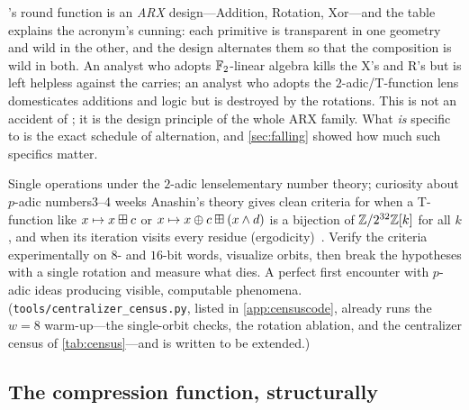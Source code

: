 \SHA{}'s round function is an \emph{ARX} design---Addition, Rotation,
Xor---and the table explains the acronym's cunning: each primitive is
transparent in one geometry and wild in the other, and the design
alternates them so that the composition is wild in both. An analyst who
adopts $\mathbb{F}_2$-linear algebra kills the X's and R's but is left helpless
against the carries; an analyst who adopts the $2$-adic/T-function lens
domesticates additions and logic but is destroyed by the rotations. This
is not an accident of \SHA{}; it is the design principle of the whole ARX
family. What \emph{is} specific to \SHA{} is the exact schedule of
alternation, and \cref{sec:falling} showed how much such specifics matter.

\begin{project}{Single operations under the $2$-adic lens}{elementary
  number theory; curiosity about $p$-adic numbers}{3--4 weeks}
  Anashin's theory gives clean criteria for when a T-function like
  $x \mapsto x \boxplus c$ or $x \mapsto x \oplus c \boxplus (x \wedge d)$
  is a bijection of $\mathbb{Z}/2^{32}\mathbb{Z}[k]$ for all $k$, and when its iteration visits
  every residue (ergodicity)~\citep{Anashin2006, KlimovShamir2003}.
  Verify the criteria experimentally on $8$- and $16$-bit words, visualize
  orbits, then break the hypotheses with a single rotation and measure
  what dies. A perfect first encounter with $p$-adic ideas producing
  visible, computable phenomena.
  (\texttt{tools/centralizer\_census.py}, listed in
  \cref{app:censuscode}, already runs the $w=8$ warm-up---the
  single-orbit checks, the rotation ablation, and the centralizer
  census of \cref{tab:census}---and is written to be extended.)
\end{project}

\subsection{The compression function, structurally}
\label{sec:roundshape}

